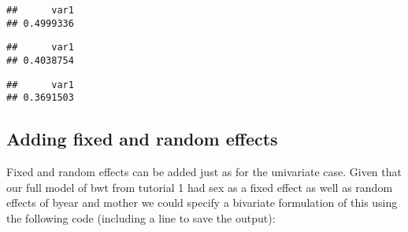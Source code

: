 \documentclass[12pt,]{book}
\newenvironment{Shaded}{\begin{snugshade}}{\end{snugshade}}
\newcommand{\FloatTok}[1]{\textcolor[rgb]{0.00,0.00,0.81}{#1}}
\newcommand{\KeywordTok}[1]{\textcolor[rgb]{0.13,0.29,0.53}{\textbf{#1}}}
\newcommand{\NormalTok}[1]{#1}
\newcommand{\OperatorTok}[1]{\textcolor[rgb]{0.81,0.36,0.00}{\textbf{#1}}}
\newcommand{\StringTok}[1]{\textcolor[rgb]{0.31,0.60,0.02}{#1}}
\begin{document}
\begin{verbatim}
##      var1 
## 0.4999336
\end{verbatim}

\begin{Shaded}
\end{Shaded}

\begin{verbatim}
##      var1 
## 0.4038754
\end{verbatim}

\begin{Shaded}
\end{Shaded}

\begin{verbatim}
##      var1 
## 0.3691503
\end{verbatim}

\hypertarget{adding-fixed-and-random-effects-1}{%
\subsection{Adding fixed and random effects}\label{adding-fixed-and-random-effects-1}}

Fixed and random effects can be added just as for the univariate case.
Given that our full model of bwt from tutorial 1 had sex as a fixed effect as well as random effects of byear and mother we could specify a bivariate formulation of this using the following code (including a line to save the output):
\end{document}
